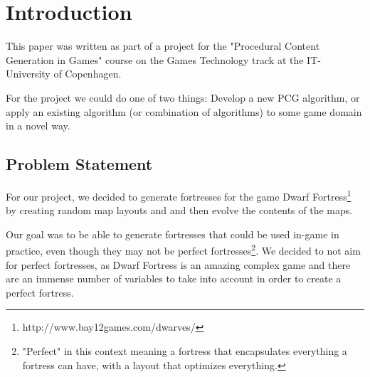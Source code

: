 \section{Introduction}
\label{01}

This paper was written as part of a project for the "Procedural Content Generation in Games" course on the Games Technology track at the IT-University of Copenhagen.

For the project we could do  one of two things: Develop a new PCG algorithm, or apply an existing algorithm (or combination of algorithms) to some game domain in a novel way.

\subsection{Problem Statement}
\label{01_01}

For our project, we decided to generate fortresses for the game Dwarf Fortress\footnote{http://www.bay12games.com/dwarves/} by creating random map layouts and and then evolve the contents of the maps.

Our goal was to be able to generate fortresses that could be used in-game in practice, even though they may not be perfect fortresses\footnote{"Perfect" in this context meaning a fortress that encapsulates everything a fortress can have, with a layout that optimizes everything.}. We decided to not aim for perfect fortresses, as Dwarf Fortress is an amazing complex game and there are an immense number of variables to take into account in order to create a perfect fortress.


